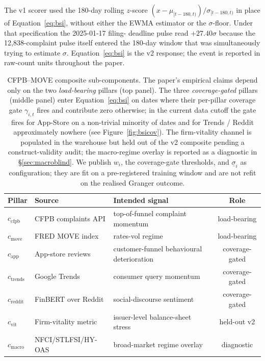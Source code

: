 \documentclass[11pt,letterpaper]{article}
\begin{document}
The v1 scorer used the 180-day rolling $z$-score
\mbox{$(x - \mu_{[t-180,t)}) / \sigma_{[t-180,t)}$} in place of
Equation~\eqref{eq:bsi}, without either the EWMA estimator or the
$\sigma$-floor. Under that specification the 2025-01-17 filing-
deadline pulse read $+27.40\sigma$ because the 12{,}838-complaint
pulse itself entered the 180-day window that was simultaneously
trying to estimate $\sigma$. Equation~\eqref{eq:bsi} is the v2
response; the event is reported in raw-count units throughout the
paper.

\begin{table}[H]
\centering
\small
\begin{tabular}{lllc}
\toprule
\textbf{Pillar} & \textbf{Source} & \textbf{Intended signal} & \textbf{Role} \\
\midrule
$c_{\text{cfpb}}$    & CFPB complaints API  & top-of-funnel complaint momentum         & load-bearing \\
$c_{\text{move}}$    & FRED MOVE index      & rates-vol regime                         & load-bearing \\
\midrule
$c_{\text{app}}$     & App-store reviews    & customer-funnel behavioural deterioration & coverage-gated \\
$c_{\text{trends}}$  & Google Trends        & consumer query momentum                   & coverage-gated \\
$c_{\text{reddit}}$  & FinBERT over Reddit  & social-discourse sentiment                & coverage-gated \\
\midrule
$c_{\text{vit}}$     & Firm-vitality metric & issuer-level balance-sheet stress         & held-out v2 \\
$c_{\text{macro}}$   & NFCI/STLFSI/HY-OAS   & broad-market regime overlay               & diagnostic \\
\bottomrule
\end{tabular}
\caption{CFPB--MOVE composite sub-components. The paper's empirical
claims depend only on the two \emph{load-bearing} pillars (top
panel). The three \emph{coverage-gated} pillars (middle panel) enter
Equation~\eqref{eq:bsi} on dates where their per-pillar coverage
gate $\gamma_{i,t}$ fires and contribute zero otherwise; in the
current data cutoff the gate fires for App-Store on a non-trivial
minority of dates and for Trends / Reddit approximately nowhere
(see Figure~\ref{fig:bsicov}). The firm-vitality channel is
populated in the warehouse but held out of the v2 composite pending
a construct-validity audit; the macro-regime overlay is reported as
a diagnostic in \S\ref{sec:macroblind}. We publish $w_i$, the
coverage-gate thresholds, and $\underline{\sigma}_i$ as
configuration; they are fit on a pre-registered training window
and are not refit on the realised Granger outcome.}
\label{tab:bsi-components}
\end{table}
\end{document}
